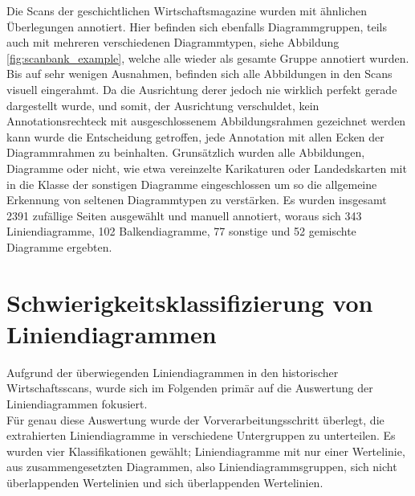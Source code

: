 Die Scans der geschichtlichen Wirtschaftsmagazine wurden mit ähnlichen Überlegungen annotiert. Hier befinden sich ebenfalls Diagrammgruppen, teils auch mit mehreren verschiedenen Diagrammtypen, siehe Abbildung \ref{fig:scanbank_example}, welche alle wieder als gesamte Gruppe annotiert wurden. Bis auf sehr wenigen Ausnahmen, befinden sich alle Abbildungen in den Scans visuell eingerahmt. Da die Ausrichtung derer jedoch nie wirklich perfekt gerade dargestellt wurde, und somit, der Ausrichtung verschuldet, kein Annotationsrechteck mit ausgeschlossenem Abbildungsrahmen gezeichnet werden kann wurde die Entscheidung getroffen, jede Annotation mit allen Ecken der Diagrammrahmen zu beinhalten. Grunsätzlich wurden alle Abbildungen, Diagramme oder nicht, wie etwa vereinzelte Karikaturen oder Landedskarten mit in die Klasse der sonstigen Diagramme eingeschlossen um so die allgemeine Erkennung von seltenen Diagrammtypen zu verstärken.
Es wurden insgesamt 2391 zufällige Seiten ausgewählt und manuell annotiert, woraus sich 343 Liniendiagramme, 102 Balkendiagramme, 77 sonstige und 52 gemischte Diagramme ergebten.

\clearpage
\section{Schwierigkeitsklassifizierung von Liniendiagrammen}
\label{ch:linebank}

Aufgrund der überwiegenden Liniendiagrammen in den historischer Wirtschaftsscans, wurde sich im Folgenden primär auf die Auswertung der Liniendiagrammen fokusiert.
\\
Für genau diese Auswertung wurde der Vorverarbeitungsschritt überlegt, die extrahierten Liniendiagramme in verschiedene Untergruppen zu unterteilen. Es wurden vier Klassifikationen gewählt; Liniendiagramme mit nur einer Wertelinie, aus zusammengesetzten Diagrammen, also Liniendiagrammsgruppen, sich nicht überlappenden Wertelinien und sich überlappenden Wertelinien.

